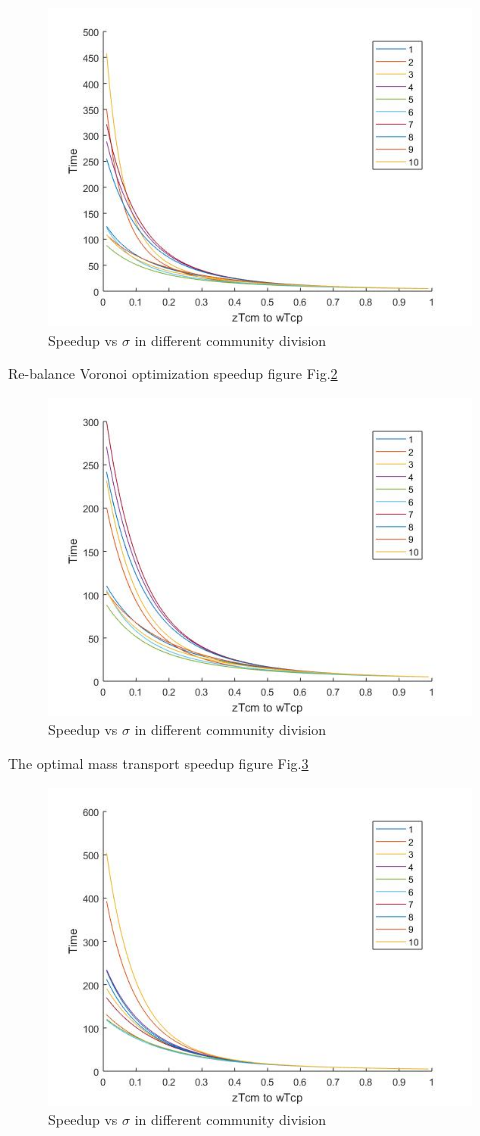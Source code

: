 \begin{figure}[h]
\centering\includegraphics[width=0.8\linewidth]{figure/2voronoicurve}
\caption{Speedup vs $\sigma$ in different community division}
\label{2voronoicurve}
\end{figure}

Re-balance Voronoi optimization speedup figure Fig.\ref{2voronoicurve2}
\\
\begin{figure}[h]
\centering\includegraphics[width=0.8\linewidth]{figure/2voronoicurve2}
\caption{Speedup vs $\sigma$ in different community division}
\label{2voronoicurve2}
\end{figure}

The optimal mass transport speedup figure Fig.\ref{2voronoicurve3}
\\
\begin{figure}[h]
\centering\includegraphics[width=0.8\linewidth]{figure/2voronoicurve3}
\caption{Speedup vs $\sigma$ in different community division}
\label{2voronoicurve3}
\end{figure}
